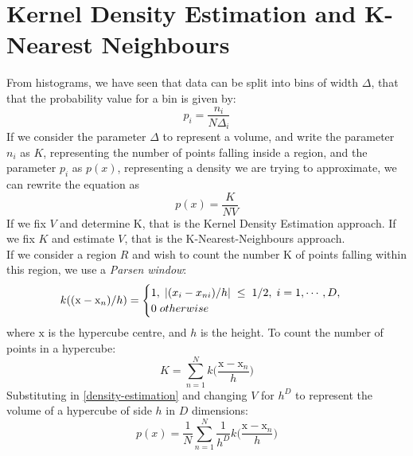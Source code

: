 \section{Kernel Density Estimation and K-Nearest Neighbours}
From histograms, we have seen that data can be split into bins of width $\Delta$, that that the probability value for a bin is given by:
$$
    p_i=\frac{n_i}{N\Delta_i}
$$
If we consider the parameter $\Delta$ to represent a volume, and write the parameter $n_i$ as $K$, representing the number of points falling inside a region, and the parameter $p_i$ as $p(x)$, representing a density we are trying to approximate, we can rewrite the equation as
\begin{equation}
    p(x)=\frac{K}{NV} \label{density-estimation}
\end{equation}
If we fix $V$ and determine K, that is the Kernel Density Estimation approach. If we fix $K$ and estimate $V$, that is the K-Nearest-Neighbours approach.\\
If we consider a region $R$ and wish to count the number K of points falling within this region, we use a \textit{Parsen window}:
$$
  k((\mathrm{x}-\mathrm{x}_n)/h) = \begin{cases}
               1,\hspace{1mm}|(x_i-x_{ni})/h|\hspace{1mm} \leq\hspace{1mm} 1/2, \hspace{1mm}i = 1,\cdots, D, \\
               0\hspace{1mm}otherwise
            \end{cases}
$$
where $\mathrm{x}$ is the hypercube centre, and $h$ is the height. To count the number of points in a hypercube:
\begin{equation}
K = \sum_{n=1}^Nk\bigg(\frac{\mathrm{x}-\mathrm{x}_n}{h}\bigg)
\end{equation}
Substituting in \ref{density-estimation} and changing $V$ for $h^D$ to represent the volume of a hypercube of side $h$ in $D$ dimensions:
\begin{equation}
    p(x) = \frac{1}{N}\sum_{n=1}^N \frac{1}{h^D} k\bigg(\frac{\mathrm{x}-\mathrm{x}_n}{h}\bigg)
\end{equation}




